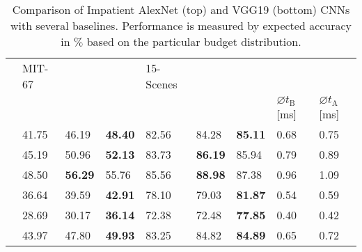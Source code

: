 \documentclass{bmvc2k}
\begin{document}
\begin{table}[tb]
{\begin{tabular}
{                C{0.12\textwidth}C{0.12\textwidth}C{0.12\textwidth}  |
                C{0.12\textwidth}C{0.12\textwidth}
            }
            \toprule
             & MIT-67 &&& 15-Scenes &&& & \\
                &  &  & 
            &  &  &  & $\varnothing t_{\text{B}}$ [ms] & $\varnothing t_{\text{A}}$ [ms]\\
            \midrule
                    & 41.75      & 46.19      & \bf{48.40}
                                & 82.56      & 84.28      & \bf{85.11}
                                & 0.68       & 0.75\\
                   & 45.19      & 50.96      & \bf{52.13}
                                & 83.73      & \bf{86.19} & 85.94
                                & 0.79       & 0.89\\
                  & 48.50      & \bf{56.29} & 55.76
                                & 85.56      & \bf{88.98} & 87.38
                                & 0.96       & 1.09\\
                  & 36.64      & 39.59      & \bf{42.91}
                                & 78.10      & 79.03      & \bf{81.87}
                                & 0.54       & 0.59\\
                 & 28.69      & 30.17      & \bf{36.14}
                                & 72.38      & 72.48      & \bf{77.85}
                                & 0.40       & 0.42\\
                  & 43.97      & 47.80      & \bf{49.93}
                                & 83.25      & 84.82      & \bf{84.89}
                                & 0.65       & 0.72\\
            \bottomrule
        \end{tabular}
        }
        \caption{
            Comparison of Impatient AlexNet (top) and VGG19 (bottom) CNNs with several baselines.
            Performance is measured by expected accuracy in $\%$ based on the particular budget distribution.
            \label{tab:experiments:baselinesvgg}
        }

    \end{table}
\end{document}
